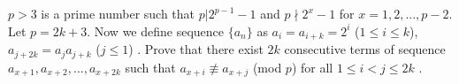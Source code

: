 $p > 3$ is a prime number such that $p|2^{p-1} - 1$ and $p  \nmid 2^x - 1$ for $x = 1, 2,...,p-2$. Let $p = 2k + 3$.
Now we define sequence $\{a_n\}$ as $a_i = a_{i+k} = 2^i$ ($1 \le  i  \le k$),  $a_{j+2k} = a_ja_{j+k}$ ($j \le 1$) .
Prove that there exist $2k$ consecutive terms of sequence $a_{x+1},a_{x+2},..., a_{x+2k}$
such that  $a_{x+i } \not\equiv a_{x+j}$ (mod $p$) for all $1 \le i < j  \le  2k$ .